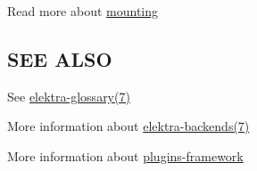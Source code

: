Read more about \hyperlink{md_doc_help_elektra-mounting_doc_help_elektra-mounting_md}{mounting}

\subsection*{S\+EE A\+L\+SO}


\begin{DoxyItemize}
\item See \hyperlink{md_doc_help_elektra-glossary_doc_help_elektra-glossary_md}{elektra-\/glossary(7)}
\item More information about \hyperlink{md_doc_help_elektra-backends_doc_help_elektra-backends_md}{elektra-\/backends(7)}
\item More information about \hyperlink{doc_dev_plugins-framework_md}{plugins-\/framework} 
\end{DoxyItemize}